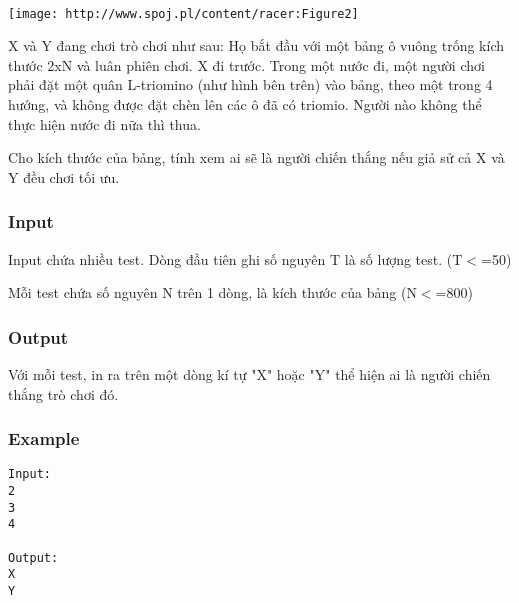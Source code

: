 

 


\texttt{[image: http://www.spoj.pl/content/racer:Figure2]}

X và Y đang chơi trò chơi như sau: Họ bắt đầu với một bảng ô vuông trống kích thước 2xN và luân phiên chơi. X đi trước. Trong một nước đi, một người chơi phải đặt một quân L-triomino (như hình bên trên) vào bảng, theo một trong 4 hướng, và không được đặt chèn lên các ô đã có triomio. Người nào không thể thực hiện nước đi nữa thì thua.

Cho kích thước của bảng, tính xem ai sẽ là người chiến thắng nếu giả sử cả X và Y đều chơi tối ưu.

\subsubsection{Input}

Input chứa nhiều test. Dòng đầu tiên ghi số nguyên T là số lượng test. (T$<$=50)

Mỗi test chứa số nguyên N trên 1 dòng, là kích thước của bảng (N$<$=800)

\subsubsection{Output}

Với mỗi test, in ra trên một dòng kí tự "X" hoặc "Y" thể hiện ai là người chiến thắng trò chơi đó.

\subsubsection{Example}
\begin{verbatim}
Input:
2
3
4

Output:
X
Y
\end{verbatim}